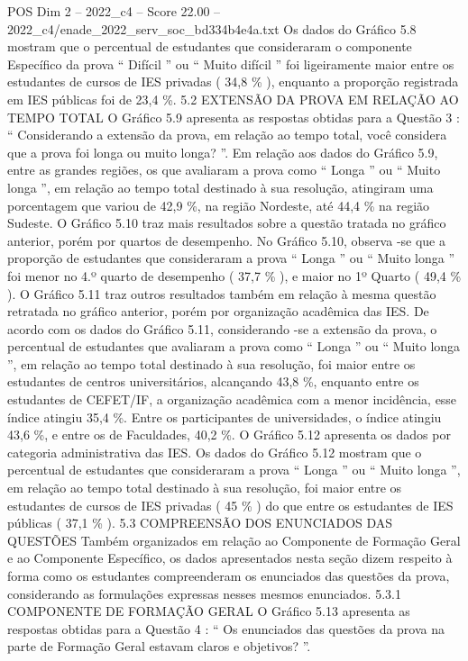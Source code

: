 \begin{textsample}{POS Dim 2 – 2022\_c4 – Score 22.00 – 2022\_c4/enade\_2022\_serv\_soc\_bd334b4e4a.txt}
Os dados do Gráfico 5.8 mostram que o percentual de estudantes que consideraram o componente Específico da prova “ Difícil ” ou “ Muito difícil ” foi ligeiramente maior entre os estudantes de cursos de IES privadas ( 34,8 \% ), enquanto a proporção registrada em IES públicas foi de 23,4 \%. 5.2 EXTENSÃO DA PROVA EM RELAÇÃO AO TEMPO TOTAL O Gráfico 5.9 apresenta as respostas obtidas para a Questão 3 : “ Considerando a extensão da prova, em relação ao tempo total, você considera que a prova foi longa ou muito longa? ”.
Em relação aos dados do Gráfico 5.9, entre as grandes regiões, os que avaliaram a prova como “ Longa ” ou “ Muito longa ”, em relação ao tempo total destinado à sua resolução, atingiram uma porcentagem que variou de 42,9 \%, na região Nordeste, até 44,4 \% na região Sudeste.
O Gráfico 5.10 traz mais resultados sobre a questão tratada no gráfico anterior, porém por quartos de desempenho.
No Gráfico 5.10, observa -se que a proporção de estudantes que consideraram a prova “ Longa ” ou “ Muito longa ” foi menor no 4.º quarto de desempenho ( 37,7 \% ), e maior no 1º Quarto ( 49,4 \% ).
O Gráfico 5.11 traz outros resultados também em relação à mesma questão retratada no gráfico anterior, porém por organização acadêmica das IES.
De acordo com os dados do Gráfico 5.11, considerando -se a extensão da prova, o percentual de estudantes que avaliaram a prova como “ Longa ” ou “ Muito longa ”, em relação ao tempo total destinado à sua resolução, foi maior entre os estudantes de centros universitários, alcançando 43,8 \%, enquanto entre os estudantes de CEFET/IF, a organização acadêmica com a menor incidência, esse índice atingiu 35,4 \%.
Entre os participantes de universidades, o índice atingiu 43,6 \%, e entre os de Faculdades, 40,2 \%.
O Gráfico 5.12 apresenta os dados por categoria administrativa das IES.
Os dados do Gráfico 5.12 mostram que o percentual de estudantes que consideraram a prova “ Longa ” ou “ Muito longa ”, em relação ao tempo total destinado à sua resolução, foi maior entre os estudantes de cursos de IES privadas ( 45 \% ) do que entre os estudantes de IES públicas ( 37,1 \% ). 5.3 COMPREENSÃO DOS ENUNCIADOS DAS QUESTÕES Também organizados em relação ao Componente de Formação Geral e ao Componente Específico, os dados apresentados nesta seção dizem respeito à forma como os estudantes compreenderam os enunciados das questões da prova, considerando as formulações expressas nesses mesmos enunciados. 5.3.1 COMPONENTE DE FORMAÇÃO GERAL O Gráfico 5.13 apresenta as respostas obtidas para a Questão 4 : “ Os enunciados das questões da prova na parte de Formação Geral estavam claros e objetivos? ”.

\end{textsample}
